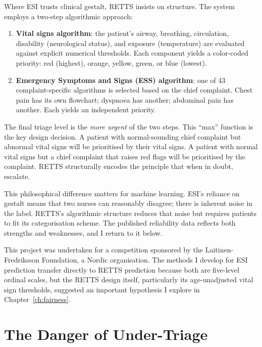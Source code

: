 Where ESI trusts clinical gestalt, RETTS insists on structure. The system employs a two-step algorithmic approach:

\begin{enumerate}
 \item \textbf{Vital signs algorithm}: the patient's airway, breathing, circulation, disability (neurological status), and exposure (temperature) are evaluated against explicit numerical thresholds. Each component yields a color-coded priority: red (highest), orange, yellow, green, or blue (lowest).
 \item \textbf{Emergency Symptoms and Signs (ESS) algorithm}: one of 43 complaint-specific algorithms is selected based on the chief complaint. Chest pain has its own flowchart; dyspnoea has another; abdominal pain has another. Each yields an independent priority.
\end{enumerate}

The final triage level is the \emph{more urgent} of the two steps. This ``max'' function is the key design decision. A patient with normal-sounding chief complaint but abnormal vital signs will be prioritised by their vital signs. A patient with normal vital signs but a chief complaint that raises red flags will be prioritised by the complaint. RETTS structurally encodes the principle that when in doubt, escalate.

This philosophical difference matters for machine learning. ESI's reliance on gestalt means that two nurses can reasonably disagree; there is inherent noise in the label. RETTS's algorithmic structure reduces that noise but requires patients to fit its categorisation scheme. The published reliability data reflects both strengths and weaknesses, and I return to it below.

\begin{remarkbox}
This project was undertaken for a competition sponsored by the Laitinen-Fredriksson Foundation, a Nordic organisation. The methods I develop for ESI prediction transfer directly to RETTS prediction because both are five-level ordinal scales, but the RETTS design itself, particularly its age-unadjusted vital sign thresholds, suggested an important hypothesis I explore in Chapter~\ref{ch:fairness}.
\end{remarkbox}

\section{The Danger of Under-Triage}

